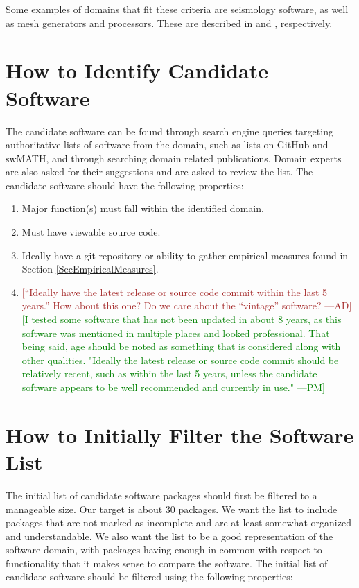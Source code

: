 \documentclass[letterpaper,cleveref]{lipics-v2019}
\newcommand{\authornote}[3]{\textcolor{#1}{[#3 ---#2]}}
\newcommand{\authornote}[3]{}
\newcommand{\pmi}[1]{\authornote{green}{PM}{#1}} %
\newcommand{\ad}[1]{\authornote{brown}{AD}{#1}} %
\theoremstyle{definition}
\begin{document}
Some examples of domains that fit these criteria are seismology software, as well as mesh generators and processors. These are described in \citep{SmithEtAl2018} and \citep{smith2016state}, respectively.


\section{How to Identify Candidate Software} \label{SecIdentifyCandSoft}
The candidate software can be found through search engine queries targeting authoritative lists of software from the domain, such as lists on GitHub and swMATH, and through searching domain related publications. Domain experts are also asked for their suggestions and are asked to review the list. The candidate software should have the following properties:

\begin{enumerate}
	\item Major function(s) must fall within the identified domain.
	\item Must have viewable source code.
	\item Ideally have a git repository or ability to gather empirical measures found in Section \ref{SecEmpiricalMeasures}.
	\item \ad{``Ideally have the latest release or source code commit within the last 5 years.'' How about this one? Do we care about the ``vintage'' software?}\pmi{I tested some software that has not been updated in about 8 years, as this software was mentioned in multiple places and looked professional. That being said, age should be noted as something that is considered along with other qualities. "Ideally the latest release or source code commit should be relatively recent, such as within the last 5 years, unless the candidate software appears to be well recommended and currently in use."}
\end{enumerate}

\section{How to Initially Filter the Software List} \label{SecInitialFilter}
The initial list of candidate software packages should first be filtered to a manageable size. Our target is about 30 packages. We want the list to include packages that are not marked as incomplete and are at least somewhat organized and understandable. We also want the list to be a good representation of the software domain, with packages having enough in common with respect to functionality that it makes sense to compare the software. The initial list of candidate software should be filtered using the following properties:
\end{document}
